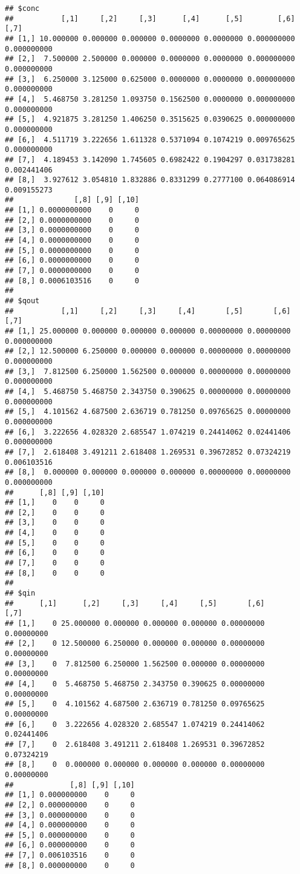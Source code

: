 \documentclass[
]{article}
\begin{document}
\begin{verbatim}
## $conc
##           [,1]     [,2]     [,3]      [,4]      [,5]        [,6]        [,7]
## [1,] 10.000000 0.000000 0.000000 0.0000000 0.0000000 0.000000000 0.000000000
## [2,]  7.500000 2.500000 0.000000 0.0000000 0.0000000 0.000000000 0.000000000
## [3,]  6.250000 3.125000 0.625000 0.0000000 0.0000000 0.000000000 0.000000000
## [4,]  5.468750 3.281250 1.093750 0.1562500 0.0000000 0.000000000 0.000000000
## [5,]  4.921875 3.281250 1.406250 0.3515625 0.0390625 0.000000000 0.000000000
## [6,]  4.511719 3.222656 1.611328 0.5371094 0.1074219 0.009765625 0.000000000
## [7,]  4.189453 3.142090 1.745605 0.6982422 0.1904297 0.031738281 0.002441406
## [8,]  3.927612 3.054810 1.832886 0.8331299 0.2777100 0.064086914 0.009155273
##              [,8] [,9] [,10]
## [1,] 0.0000000000    0     0
## [2,] 0.0000000000    0     0
## [3,] 0.0000000000    0     0
## [4,] 0.0000000000    0     0
## [5,] 0.0000000000    0     0
## [6,] 0.0000000000    0     0
## [7,] 0.0000000000    0     0
## [8,] 0.0006103516    0     0
## 
## $qout
##           [,1]     [,2]     [,3]     [,4]       [,5]       [,6]        [,7]
## [1,] 25.000000 0.000000 0.000000 0.000000 0.00000000 0.00000000 0.000000000
## [2,] 12.500000 6.250000 0.000000 0.000000 0.00000000 0.00000000 0.000000000
## [3,]  7.812500 6.250000 1.562500 0.000000 0.00000000 0.00000000 0.000000000
## [4,]  5.468750 5.468750 2.343750 0.390625 0.00000000 0.00000000 0.000000000
## [5,]  4.101562 4.687500 2.636719 0.781250 0.09765625 0.00000000 0.000000000
## [6,]  3.222656 4.028320 2.685547 1.074219 0.24414062 0.02441406 0.000000000
## [7,]  2.618408 3.491211 2.618408 1.269531 0.39672852 0.07324219 0.006103516
## [8,]  0.000000 0.000000 0.000000 0.000000 0.00000000 0.00000000 0.000000000
##      [,8] [,9] [,10]
## [1,]    0    0     0
## [2,]    0    0     0
## [3,]    0    0     0
## [4,]    0    0     0
## [5,]    0    0     0
## [6,]    0    0     0
## [7,]    0    0     0
## [8,]    0    0     0
## 
## $qin
##      [,1]      [,2]     [,3]     [,4]     [,5]       [,6]       [,7]
## [1,]    0 25.000000 0.000000 0.000000 0.000000 0.00000000 0.00000000
## [2,]    0 12.500000 6.250000 0.000000 0.000000 0.00000000 0.00000000
## [3,]    0  7.812500 6.250000 1.562500 0.000000 0.00000000 0.00000000
## [4,]    0  5.468750 5.468750 2.343750 0.390625 0.00000000 0.00000000
## [5,]    0  4.101562 4.687500 2.636719 0.781250 0.09765625 0.00000000
## [6,]    0  3.222656 4.028320 2.685547 1.074219 0.24414062 0.02441406
## [7,]    0  2.618408 3.491211 2.618408 1.269531 0.39672852 0.07324219
## [8,]    0  0.000000 0.000000 0.000000 0.000000 0.00000000 0.00000000
##             [,8] [,9] [,10]
## [1,] 0.000000000    0     0
## [2,] 0.000000000    0     0
## [3,] 0.000000000    0     0
## [4,] 0.000000000    0     0
## [5,] 0.000000000    0     0
## [6,] 0.000000000    0     0
## [7,] 0.006103516    0     0
## [8,] 0.000000000    0     0
\end{verbatim}
\end{document}
